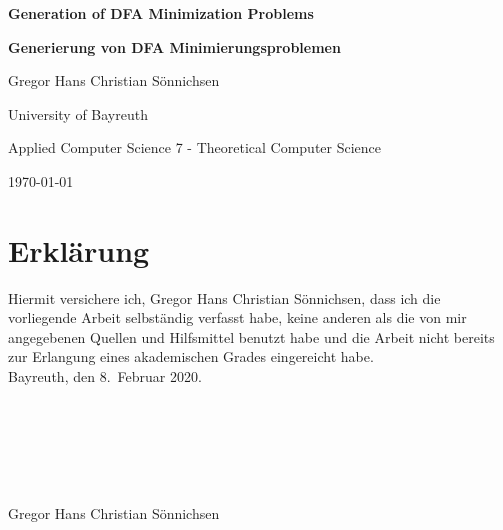 \documentclass[a4paper, oneside, 11pt]{book}
\theoremstyle{definition}
\theoremstyle{remark}
\begin{document}
	
	\frontmatter
	
	\begin{titlepage}
		\centering
		{\huge\bfseries Generation of DFA Minimization Problems\par}
		\vspace{1cm}
		{\large\bfseries Generierung von DFA Minimierungsproblemen\par}
		\vspace{2cm}
		{\large Gregor Hans Christian Sönnichsen\par}
		\vfill
		{\large University of Bayreuth \par}
		{\large Applied Computer Science 7 - Theoretical Computer Science \par}
		\vspace{1cm}
		{\large \today\par}
	\end{titlepage}
	
	
	
	
	
	
	
	\renewcommand{\contentsname}{Table of Contents}
	\tableofcontents
	
	\mainmatter
	
	
	
	
	
	
	
	\appendix
	
	\nocite{*}
	
	
	
	\chapter*{Erklärung}
	
	Hiermit versichere ich, Gregor Hans Christian Sönnichsen, dass ich die vorliegende Arbeit selbständig verfasst habe, keine anderen als die von mir angegebenen Quellen und Hilfsmittel benutzt habe und die Arbeit nicht  bereits zur Erlangung eines akademischen Grades eingereicht habe. \\
	
	\noindent Bayreuth, den 8.\ Februar 2020. \\\\\\\\\\\\\\
	\noindent Gregor Hans Christian Sönnichsen
\end{document}
